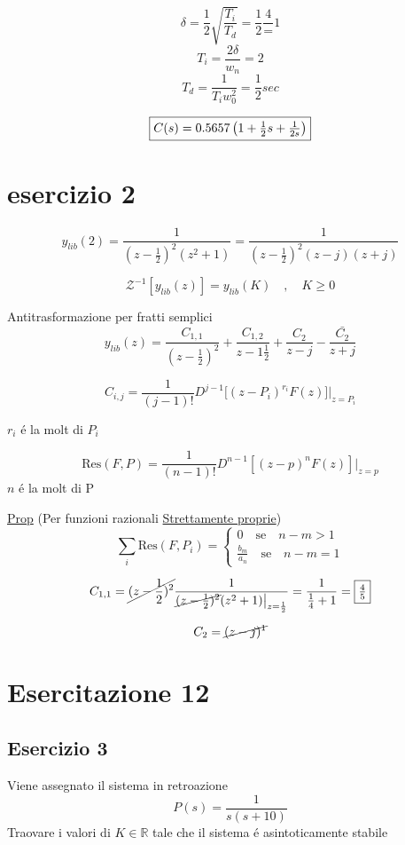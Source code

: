 \documentclass{article}
\begin{document}
\[ \delta = \frac{1}{2}\sqrt{\frac{T_i}{T_d}} = \frac{1}{2}\frac{4} = 1 \]
\[ T_i = \frac{2\delta}{w_n} = 2 \]
\[ T_d = \frac{1}{T_i w_0^2} = \frac{1}{2} sec \]

\[\framebox{$C(s) = 0.5657 \left( 1 + \frac{1}{2}s + \frac{1}{2s}\right) $}\]

\section{esercizio 2}
\[ y_{lib}(2) = \frac{1}{(z - \frac{1}{2}) ^2 (z^2 + 1)}  = \frac{1}{\left(z - \frac{1}{2}\right)^2(z -j)(z + j)} \]

\[ \mathcal{Z}^{-1}[ y_{lib}(z)] = y_{lib}(K) \quad , \quad K \ge 0 \]

Antitrasformazione per fratti semplici
\[ y_{lib}(z) = \frac{C_{1, 1}}{\left( z - \frac{1}{2}\right)^2} + \frac{C_{1, 2}}{z - 1\frac{1}{2}} + \frac{C_2}{z - j} - \frac{\bar{C_2}}{z+j} \]

\[ C_{i, j} = \frac{1}{(j-1)!} D^{j-1}\big[ (z-P_i)^{r_i} F(z)\big]\big|_{z=P_i} \]

$r_i$ \'e la molt di $P_i$

\[ \text{Res}(F, P) = \frac{1}{(n-1)!} D^{n-1}[(z-p)^n F(z)]\big|_{z=p} \]
$n$ \'e la molt di P

\underline{Prop} (Per funzioni razionali \underline{Strettamente proprie})
\[
    \sum_i \text{Res}(F, P_i) = \begin{cases}
        0 \quad \text{se} \quad n-m > 1 \\
        \frac{b_m}{a_n} \quad \text{se} \quad n-m = 1
    \end{cases}
\]

\[ C_{1,1} = \cancel{(z - \frac{1}{2})^2} \frac{1}{\cancel{(z - \frac{1}{2})^2} (z^2 +1) \big|_{z=\frac{1}{2}}} = \frac{1}{\frac{1}{4} + 1} = \framebox{$\frac{4}{5}$} \]

\[ C_2 = \cancel{(z - j)^1} \]

\section{Esercitazione 12}
\subsection{Esercizio 3}

Viene assegnato il sistema in retroazione
\[ P(s) = \frac{1}{s(s+10)} \]
Traovare i valori di $K \in \mathbb{R}$ tale che il sistema \'e asintoticamente stabile
\end{document}
